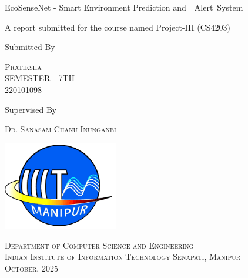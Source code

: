 \documentclass[a4paper,11pt,oneside]{report}
\begin{document}
	\begin{titlepage}

		\centering

		\vspace*{\baselineskip}

		\vspace{0.75\baselineskip}

		{\LARGE  EcoSenseNet - Smart Environment Prediction and  Alert System}

		\vspace{0.75\baselineskip}

		\vspace{2\baselineskip}

		A report submitted for the course named Project-III (CS4203)

		\vspace*{7\baselineskip}

		Submitted By

		\vspace{0.5\baselineskip}

		{\scshape\Large Pratiksha\\ SEMESTER - 7TH \\ 220101098}

		\vspace{0.5\baselineskip}

		Supervised By

		\vspace{0.5\baselineskip}

		{\scshape\Large Dr. Sanasam Chanu Inunganbi}

		\vspace{0.5\baselineskip}

		\vfill

		\begin{center}
			\includegraphics[width=5cm]{report_file/iiit manipur.png}
		\end{center}

	{\scshape\small Department of Computer Science and Engineering\\ Indian Institute of Information Technology Senapati, Manipur \\ October, 2025}

\end{titlepage}
\end{document}
